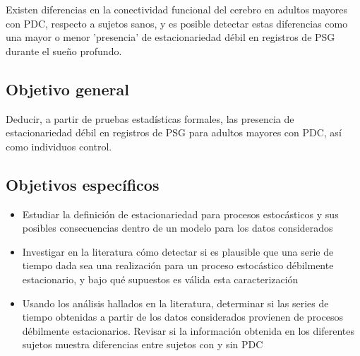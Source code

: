 Existen diferencias en la conectividad funcional del cerebro en adultos mayores con PDC, respecto
a sujetos sanos, y es posible detectar estas diferencias como una mayor o menor 'presencia' de 
estacionariedad débil en registros de PSG durante el sueño profundo.


\subsection{Objetivo general}

Deducir, a partir de pruebas estadísticas formales, las presencia de estacionariedad débil en
registros de PSG para adultos mayores con PDC, así como individuos control.


\subsection{Objetivos específicos}

\begin{itemize}
\item Estudiar la definición de estacionariedad para procesos estocásticos y sus posibles 
consecuencias dentro de un modelo para los datos considerados

\item Investigar en la literatura cómo detectar si es plausible que una serie de tiempo dada sea 
una realización para un proceso estocástico débilmente estacionario, y bajo qué supuestos 
es válida esta caracterización

\item Usando los análisis hallados en la literatura, determinar si las series de tiempo 
obtenidas a partir de los datos considerados provienen de procesos débilmente estacionarios.
Revisar si la información obtenida en los diferentes sujetos muestra diferencias entre sujetos 
con y sin PDC
\end{itemize}

